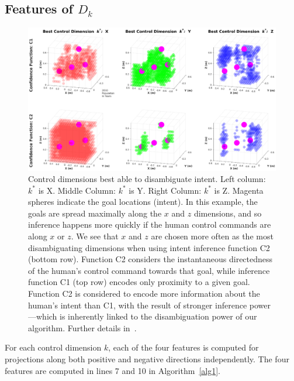 \documentclass[natbib, twocolumn]{svjour3}          %
\begin{document}
\subsection{Features of $D_k$}\label{ssec:components}
\begin{figure}[t]
	\centering
	\includegraphics[width = 1.15\hsize, height = 0.6\vsize, center]{Fig4.eps}
	\caption{Control dimensions best able to disambiguate intent.  Left column: $k^*$ is X. Middle Column: $k^*$ is Y. Right Column: $k^*$ is Z. Magenta spheres indicate the goal locations (intent). In this example, the goals are spread maximally along the $x$ and $z$ dimensions, and so inference happens more quickly if the human control commands are along $x$ or $z$. We see that $x$ and $z$ are chosen more often as the most disambiguating dimensions when using intent inference function C2 (bottom row). Function C2 considers the instantaneous directedness of the human's control command towards that goal, while inference function C1 (top row) encodes only proximity to a given goal. Function C2 is considered to encode more information about the human's intent than C1, with the result of stronger inference power---which is inherently linked to the disambiguation power of our algorithm. Further details in~\citep{gopinath2017mode}.}
	\label{fig:sim_res}
\end{figure}
For each control dimension $k$, each of the four features is computed for projections along both positive and negative directions independently. The four features are computed in lines 7 and 10 in Algorithm~\ref{alg1}.
\end{document}
